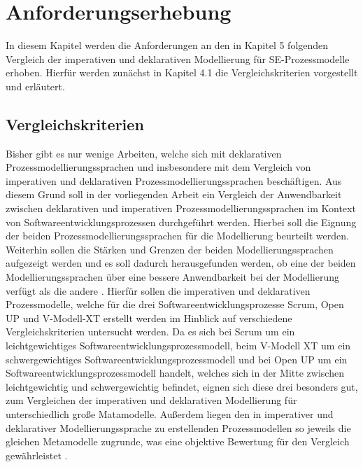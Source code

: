 
\chapter{Anforderungserhebung}\label{sec:chapter5}
In diesem Kapitel werden die Anforderungen an den in Kapitel 5 folgenden Vergleich der imperativen und deklarativen Modellierung für SE-Prozessmodelle erhoben. Hierfür werden zunächst in Kapitel 4.1 die Vergleichskriterien vorgestellt und erläutert. 

\section{Vergleichskriterien}\label{sec:chapter5:Vergleichskriterien}

Bisher gibt es nur wenige Arbeiten, welche sich mit deklarativen Prozessmodellierungssprachen und insbesondere mit dem Vergleich von imperativen und deklarativen Prozessmodellierungssprachen beschäftigen. Aus diesem Grund soll in der vorliegenden Arbeit ein Vergleich der Anwendbarkeit zwischen deklarativen und imperativen Prozessmodellierungssprachen im Kontext von Softwareentwicklungsprozessen durchgeführt werden. Hierbei soll die Eignung der beiden Prozessmodellierungssprachen für die Modellierung beurteilt werden. Weiterhin sollen die Stärken und Grenzen der beiden Modellierungssprachen aufgezeigt werden und es soll dadurch herausgefunden werden, ob eine der beiden Modellierungssprachen über eine bessere Anwendbarkeit bei der Modellierung verfügt als die andere \cite{list2006evaluation}.\newline
Hierfür sollen die imperativen und deklarativen Prozessmodelle, welche für die drei Softwareentwicklungsprozesse Scrum, Open UP und V-Modell-XT erstellt werden im Hinblick auf verschiedene Vergleichskriterien untersucht werden. Da es sich bei Scrum um ein leichtgewichtiges Softwareentwicklungsprozessmodell, beim V-Modell XT um ein schwergewichtiges Softwareentwicklungsprozessmodell und bei Open UP um ein Softwareentwicklungsprozessmodell handelt, welches sich in der Mitte zwischen leichtgewichtig und schwergewichtig befindet, eignen sich diese drei besonders gut, zum Vergleichen der imperativen und deklarativen Modellierung für unterschiedlich große Matamodelle. Außerdem liegen den in imperativer und deklarativer Modellierungssprache zu erstellenden Prozessmodellen so jeweils die gleichen Metamodelle zugrunde, was eine objektive Bewertung für den Vergleich gewährleistet \cite{list2006evaluation}. \newline


